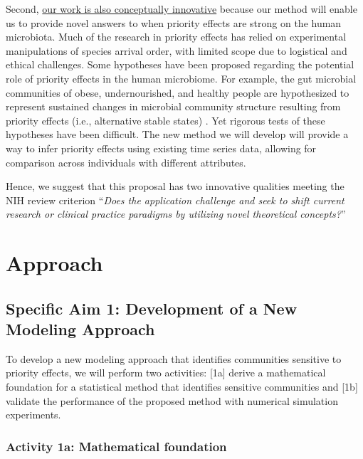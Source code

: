 \documentclass[12pt, class=article, crop=false]{standalone}
\begin{document}
Second, \ul{our work is also conceptually innovative} because our method will enable us to provide novel answers to when priority effects are strong on the human microbiota.
Much of the research in priority effects has relied on experimental manipulations of species arrival order, with limited scope due to logistical and ethical challenges.
Some hypotheses have been proposed regarding the potential role of priority effects in the human microbiome.
For example, the gut microbial communities of obese, undernourished, and healthy people are hypothesized to represent sustained changes in microbial community structure resulting from priority effects (i.e., alternative stable states) \citep{fierer_animalcules_2012}.
Yet rigorous tests of these hypotheses have been difficult. 
The new method we will develop will provide a way to infer priority effects using existing time series data, allowing for comparison across individuals with different attributes.

Hence, we suggest that this proposal has two innovative qualities meeting the NIH review criterion ``\emph{Does the application challenge and seek to shift current research or clinical practice paradigms by utilizing novel theoretical concepts?}''

\section{Approach}

\subsection*{Specific Aim 1: Development of a New Modeling Approach}

To develop a new modeling approach that identifies communities sensitive to priority effects, we will perform two activities:
[1a] derive a mathematical foundation for a statistical method that identifies sensitive communities and [1b] validate the performance of the proposed method with numerical simulation experiments.

\subsubsection*{Activity 1a: Mathematical foundation}
\end{document}
